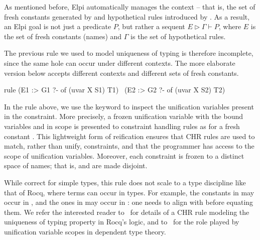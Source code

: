 \documentclass{these-ISSS}
\newenvironment{chrcode}
  {\VerbatimEnvironment\begin{chrbox}\begin{xelpicode}}{\end{xelpicode}
  \end{chrbox}}
\begin{document}
As mentioned before, Elpi automatically manages the context -- that is, the set
of fresh constants generated by  and hypothetical rules introduced by
\elpi{=>}. As a result, an Elpi goal is not just a predicate $P$, but rather a
sequent $E \triangleright  \Gamma \vdash P$, where $E$ is the set of fresh
constants (names) and $\Gamma$ is the set of hypothetical rules.

The previous rule we used to model uniqueness of typing is therefore incomplete,
since the same hole can occur under different contexts. The more elaborate
version below accepts different contexts and different sets of fresh constants.


\begin{chrcode}
rule (E1 :> G1 ?- of (uvar X S1) T1)
    \ (E2 :> G2 ?- of (uvar X S2) T2)
\end{chrcode}

\noindent
In the rule above, we use the keyword  to inspect the unification
variables present in the constraint. More precisely, a frozen unification variable
 with the bound variables  and  in scope is presented
to constraint handling rules as  for a fresh constant
. This lightweight form of
reification ensures that CHR rules are used to match, rather than unify,
constraints, and that the programmer has access to the scope of unification
variables. Moreover, each constraint is frozen to a distinct space of names;
that is,  and  are made disjoint.


While correct for simple types, this rule does not scale to a type
discipline like that of Rocq, where terms can occur in types. For example,
the constants in  may occur in , and the
ones in  may occur in : one needs to align 
with  before equating them.
We refer the interested reader to~\cite{TASSI_2019} for details of a CHR rule modeling
the uniqueness of typing property in Rocq's logic, and to~\cite{Jojgov} for
the role played by unification variable scopes in dependent type theory.



\end{document}
